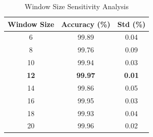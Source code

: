 
\begin{table}[t]
\centering
\caption{Window Size Sensitivity Analysis}
\label{tab:window_sensitivity}
\begin{tabular}{ccc}
\toprule
Window Size & Accuracy (\%) & Std (\%) \\
\midrule
6 & 99.89 & 0.04 \\
8 & 99.76 & 0.09 \\
10 & 99.94 & 0.03 \\
\textbf{12} & \textbf{99.97} & \textbf{0.01} \\
14 & 99.86 & 0.05 \\
16 & 99.95 & 0.03 \\
18 & 99.93 & 0.04 \\
20 & 99.96 & 0.02 \\
\bottomrule
\end{tabular}
\end{table}
